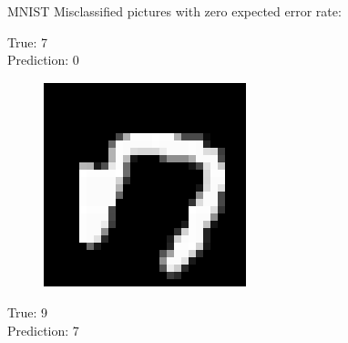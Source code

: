 \documentclass{beamer}
\begin{document}
\begin{frame}{MNIST}
	Misclassified pictures with zero expected error rate:
	\vspace{0.3cm}
	
	\begin{minipage}[t]{0.32\columnwidth}
		True: 7\\
		Prediction: 0
		\begin{figure}
			\includegraphics[width=1\columnwidth]{pres_pics/high_conf/70}
		\end{figure}
	\end{minipage}
	\begin{minipage}[t]{0.32\columnwidth}
		True: 9\\
		Prediction: 7
		\begin{figure}

\end{figure}
\end{minipage}
\end{frame}
\end{document}
